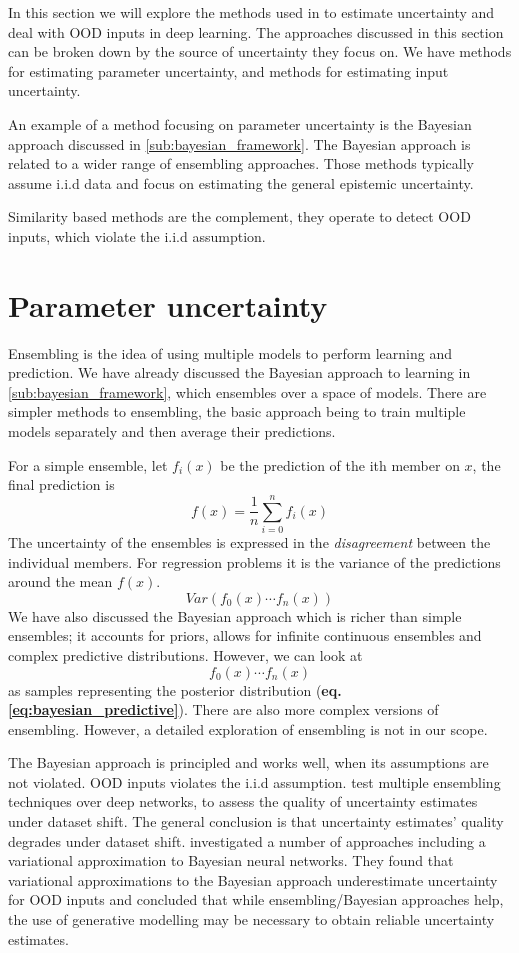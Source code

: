 \documentclass[../main.tex]{subfiles}
\begin{document}
In this section we will explore the methods used in to estimate uncertainty and deal with OOD inputs in deep learning. The approaches discussed in this section can be broken down by the source of uncertainty they focus on. We have methods for estimating parameter uncertainty, and methods for estimating input uncertainty. 

An example of a method focusing on parameter uncertainty is the Bayesian approach discussed in  \ref{sub:bayesian_framework}. The Bayesian approach is related to a wider range of ensembling approaches. Those methods typically assume i.i.d data and focus on estimating the general epistemic uncertainty. 


Similarity based methods are the complement, they operate to detect OOD inputs, which violate the i.i.d assumption.  

\section{Parameter uncertainty}

Ensembling is the idea of using multiple models to perform learning and prediction. We have already discussed the Bayesian approach to learning in \cref{sub:bayesian_framework}, which ensembles over a space of models. There are simpler methods to ensembling, the basic approach being to train multiple models separately and then average their predictions.

For a simple ensemble, let $f_i(x)$ be the prediction of the ith member on $x$, the final prediction is 
$$f(x) = \frac{1}{n} \sum_{i=0}^n f_i(x)$$ 
The uncertainty of the ensembles is expressed in the \emph{disagreement} between the individual members. For regression problems it is the variance of the predictions around the mean $f(x)$. 
$$Var(f_0(x) \cdots f_n(x))$$
We have also discussed the Bayesian approach which is richer than simple ensembles; it accounts for priors, allows for infinite continuous ensembles and complex predictive distributions. However, we can look at $${f_0(x) \cdots f_n(x)}$$ as samples representing the posterior distribution (\textbf{eq.\ref{eq:bayesian_predictive}}).
There are also more complex versions of ensembling. However, a detailed exploration of ensembling is not in our scope. 

The Bayesian approach is principled and works well, when its assumptions are not violated. OOD inputs violates the i.i.d assumption. \citet{ovadia2019can} test multiple ensembling techniques over deep networks, to assess the quality of uncertainty estimates under dataset shift. The general conclusion is that uncertainty estimates' quality degrades under dataset shift. \citet{Mundt2019open} investigated a number of approaches including a variational approximation to Bayesian neural networks. They found that variational approximations to the Bayesian approach underestimate uncertainty for OOD inputs and concluded that while ensembling/Bayesian approaches help, the use of generative modelling may be necessary to obtain reliable uncertainty estimates.
\end{document}
